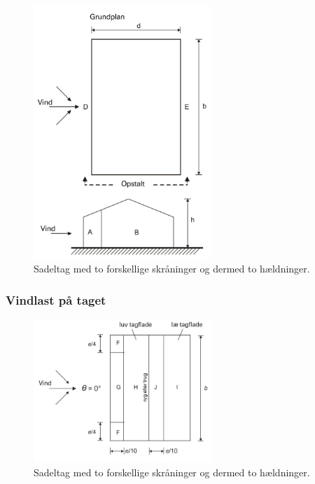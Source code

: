 \begin{figure}[H] 
\centering
\includegraphics[width=0.60\textwidth]{billeder/Vindlast1}
\caption{Sadeltag med to forskellige skråninger og dermed to hældninger.}
\label{fig:SF1}
\end{figure}



\subsubsection{Vindlast på taget}

\begin{figure}[H] 
\centering
\includegraphics[width=0.60\textwidth]{billeder/Vindlast3}
\caption{Sadeltag med to forskellige skråninger og dermed to hældninger.}
\label{fig:SF1}
\end{figure}





















